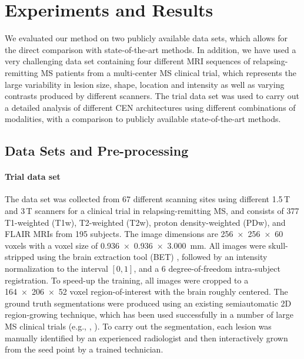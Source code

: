 
\section{Experiments and Results}


We evaluated our method on two publicly available data sets, which allows for
the direct comparison with state-of-the-art methods. In addition, we have used a
very challenging data set containing four different MRI sequences of
relapsing-remitting MS patients from a multi-center MS clinical trial, which
represents the large variability in lesion size, shape, location and intensity
as well as varying contrasts produced by different scanners. The trial data set
was used to carry out a detailed analysis of different CEN architectures using
different combinations of modalities, with a comparison to publicly available
state-of-the-art methods.

\subsection{Data Sets and Pre-processing}



\paragraph{Trial data set}

The data set was collected from 67 different scanning sites using different
1.5\,T and 3\,T scanners for a clinical trial in relapsing-remitting MS, and
consists of 377 T1-weighted (T1w), T2-weighted (T2w), proton density-weighted
(PDw), and FLAIR MRIs from 195 subjects. The image dimensions are
\num{256x256x60} voxels with a voxel size of
\SI{0.936x0.936x3.000}{\milli\metre}. All images were skull-stripped using the
brain extraction tool (BET) \cite{jenkinson2005bet2}, followed by an intensity
normalization to the interval $[0,1]$, and a 6 degree-of-freedom intra-subject
registration. To speed-up the training, all images were cropped to a
\num{164x206x52} voxel region-of-interest with the brain roughly centered. The
ground truth segmentations were produced using an existing semiautomatic 2D
region-growing technique, which has been used successfully in a number of large
MS clinical trials (e.g., \cite{kappos2006long},
\cite{traboulsee2008reduction}). To carry out the segmentation, each lesion was
manually identified by an experienced radiologist and then interactively grown
from the seed point by a trained technician.

